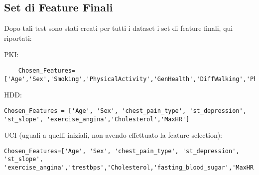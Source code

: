\subsection{Set di Feature Finali}
\begin{flushleft}
    
Dopo tali test sono stati creati per tutti i dataset i set di feature finali, qui riportati:

PKI:
\begin{lstlisting}
    Chosen_Features= ['Age','Sex','Smoking','PhysicalActivity','GenHealth','DiffWalking','PhysicalHealth','SleepTime']

\end{lstlisting}
HDD:
\begin{lstlisting}
Chosen_Features = ['Age', 'Sex', 'chest_pain_type', 'st_depression', 'st_slope', 'exercise_angina','Cholesterol','MaxHR']
\end{lstlisting}
    
UCI (uguali a quelli iniziali, non avendo effettuato la feature selection):

\begin{lstlisting}
Chosen_Features=['Age', 'Sex', 'chest_pain_type', 'st_depression', 'st_slope', 'exercise_angina','trestbps','Cholesterol,'fasting_blood_sugar','MaxHR','exercise_angina','vessel_fluoroscopy']
\end{lstlisting}
\end{flushleft}

